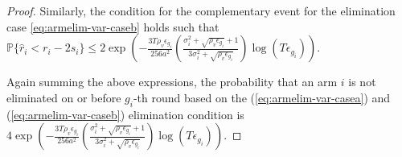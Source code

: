 \begin{proof}
  
Similarly, the condition for the complementary event for the elimination case \ref{eq:armelim-var-caseb} holds such that $\mathbb{P}\lbrace\hat{r}_{i}< r_{i} - 2s_{i}\rbrace \leq 2\exp\left(- \frac{3T\rho_v\epsilon_{g_{i}}}{256 a^2 } \left(\frac{\sigma_{i}^{2}+\sqrt{\rho_{v}\epsilon_{g_{i}}}+1}{3\sigma_{i}^{2}+\sqrt{\rho_v \epsilon_{g_{i}}}}\right) \log( T\epsilon_{g_{i}}) \right)$.

Again  summing the above expressions, the probability that an arm ${i}$ is not eliminated on or before $g_{i}$-th round based on the (\ref{eq:armelim-var-casea}) and (\ref{eq:armelim-var-caseb}) elimination condition is  $4\exp\left(- \frac{3T\rho_v\epsilon_{g_{i}}}{256 a^2 } \left(\frac{\sigma_{i}^{2}+\sqrt{\rho_{v}\epsilon_{g_{i}}}+1}{3\sigma_{i}^{2}+\sqrt{\rho_v \epsilon_{g_{i}}}}\right) \log( T\epsilon_{g_{i}}) \right)$. 
  


\end{proof}
